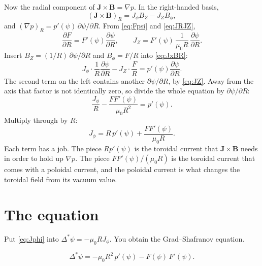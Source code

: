 \documentclass[11pt,a4paper,oneside,openany]{book}
\numberwithin{equation}{chapter}
\newcommand{\Dstar}{\Delta^{*}}
\newcommand{\grad}{\nabla}
\theoremstyle{definition}
\begin{document}
Now the radial component of \(\mathbf{J}\times\mathbf{B}=\grad p\). In the right-handed basis,
\begin{equation}
\label{eq:JxBR}
(\mathbf{J}\times\mathbf{B})_{R}=J_{\phi} B_{Z}-J_{Z} B_{\phi},
\end{equation}
and \((\grad p)_{R}=p'(\psi)\,\partial\psi/\partial R\). From \eqref{eq:Fpsi} and \eqref{eq:JRJZ},
\begin{equation}
\label{eq:JZ}
\frac{\partial F}{\partial R}=F'(\psi)\frac{\partial\psi}{\partial R},
\qquad
J_{Z}=F'(\psi)\,\frac{1}{\mu_{0} R}\,\frac{\partial\psi}{\partial R}.
\end{equation}
Insert \(B_{Z}=(1/R)\,\partial\psi/\partial R\) and \(B_{\phi}=F/R\) into \eqref{eq:JxBR}:
\begin{equation}
\label{eq:radial-balance}
J_{\phi}\cdot\frac{1}{R}\frac{\partial\psi}{\partial R}
-J_{Z}\cdot\frac{F}{R}
=p'(\psi)\frac{\partial\psi}{\partial R}.
\end{equation}
The second term on the left contains another \(\partial\psi/\partial R\), by \eqref{eq:JZ}. Away from the axis that factor is not identically zero, so divide the whole equation by \(\partial\psi/\partial R\):
\begin{equation}
\label{eq:divide}
\frac{J_{\phi}}{R}
-\frac{F F'(\psi)}{\mu_{0} R^{2}}
=p'(\psi).
\end{equation}
Multiply through by \(R\):
\begin{equation}
\label{eq:Jphi}
J_{\phi}
=R\,p'(\psi)+\frac{F F'(\psi)}{\mu_{0} R}.
\end{equation}
Each term has a job. The piece \(R p'(\psi)\) is the toroidal current that \(\mathbf{J}\times\mathbf{B}\) needs in order to hold up \(\grad p\). The piece \(FF'(\psi)/(\mu_{0} R)\) is the toroidal current that comes with a poloidal current, and the poloidal current is what changes the toroidal field from its vacuum value.

\section{The equation}

Put \eqref{eq:Jphi} into \(\Dstar\psi=-\mu_{0} R J_{\phi}\). You obtain the Grad--Shafranov equation.

\begin{gsbox}
\begin{equation}
\label{eq:gs}
\Dstar\psi=-\mu_{0} R^{2}\, p'(\psi)-F(\psi)\,F'(\psi).
\end{equation}
\end{gsbox}
\end{document}
